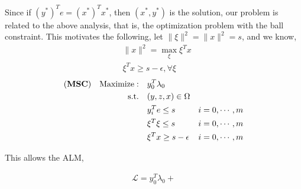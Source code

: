 \documentclass[../main]{subfiles}
\begin{document}
Since if \((y^*)^Te = (x^*)^Tx^*\), then \((x^*, y^*)\) is the solution, our problem is related to the above analysis, that is, the optimization problem with the ball constraint.
This motivates the following, let \(\|\xi\|^2 = \|x\|^2 = s\), and we know,
\begin{align}
     & \|x\|^2 = \max_\xi \xi^T x           \\
     & \xi^Tx \ge s - \epsilon, \forall \xi
\end{align}
\begin{align}
    (\textbf{MSC}) \quad \mathrm{Maximize: }\quad & y_0 ^T\lambda_0                          \\
    \mathrm{s.t.} \quad                        & (y,z,x) \in \Omega                       \\
                                               & y_i^Te \le s            & i=0, \cdots, m \\
                                               & \xi^T\xi \le s          & i=0, \cdots, m \\
                                               & \xi^Tx \ge s - \epsilon & i=0, \cdots, m \\
\end{align}

This allows the ALM,

\begin{align}
    \mathscr L = y_0 ^T\lambda_0 +
\end{align}
\end{document}
